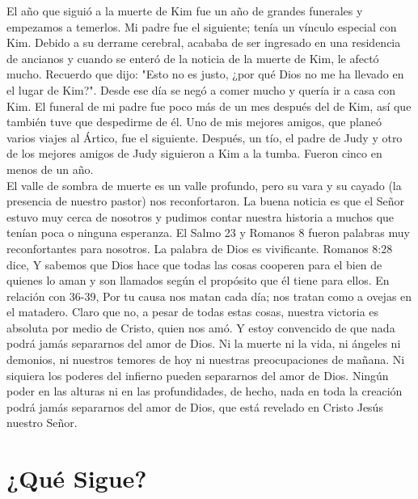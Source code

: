 \documentclass[twoside, 12pt]{book}
\begin{document}
El año que siguió a la muerte de Kim fue un año de grandes funerales y empezamos a temerlos. Mi padre fue el siguiente; tenía un vínculo especial con Kim. Debido a su derrame cerebral, acababa de ser ingresado en una residencia de ancianos y cuando se enteró de la noticia de la muerte de Kim, le afectó mucho. Recuerdo que dijo: "Esto no es justo, ¿por qué Dios no me ha llevado en el lugar de Kim?". Desde ese día se negó a comer mucho y quería ir a casa con Kim. El funeral de mi padre fue poco más de un mes después del de Kim, así que también tuve que despedirme de él. Uno de mis mejores amigos, que planeó varios viajes al Ártico, fue el siguiente. Después, un tío, el padre de Judy y otro de los mejores amigos de Judy siguieron a Kim a la tumba. Fueron cinco en menos de un año.\\

El valle de sombra de muerte es un valle profundo, pero su vara y su cayado (la presencia de nuestro pastor) nos reconfortaron. La buena noticia es que el Señor estuvo muy cerca de nosotros y pudimos contar nuestra historia a muchos que tenían poca o ninguna esperanza. El Salmo 23 y Romanos 8 fueron palabras muy reconfortantes para nosotros. La palabra de Dios es vivificante. Romanos 8:28 dice, Y sabemos que Dios hace que todas las cosas cooperen para el bien de quienes lo aman y son llamados según el propósito que él tiene para ellos. En relación con 36-39, Por tu causa nos matan cada día; nos tratan como a ovejas en el matadero. Claro que no, a pesar de todas estas cosas, nuestra victoria es absoluta por medio de Cristo, quien nos amó. Y estoy convencido de que nada podrá jamás separarnos del amor de Dios. Ni la muerte ni la vida, ni ángeles ni demonios, ni nuestros temores de hoy ni nuestras preocupaciones de mañana. Ni siquiera los poderes del infierno pueden separarnos del amor de Dios. Ningún poder en las alturas ni en las profundidades, de hecho, nada en toda la creación podrá jamás separarnos del amor de Dios, que está revelado en Cristo Jesús nuestro Señor.\\

\section{¿Qué Sigue?}
\end{document}
